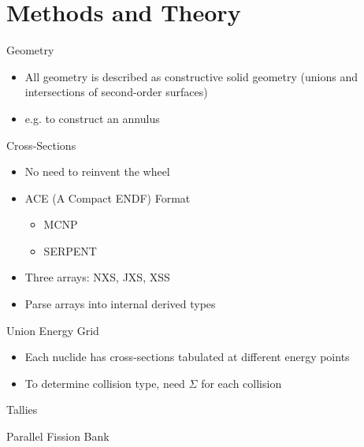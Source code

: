 \documentclass{beamer}
\begin{document}
\section{Methods and Theory}

\begin{frame}{Geometry}
  \begin{itemize}
  \item<1-> All geometry is described as constructive solid geometry (unions and
    intersections of second-order surfaces)
  \item<1-> e.g. to construct an annulus
  \end{itemize}
\end{frame}

\begin{frame}{Cross-Sections}
  \begin{itemize}
  \item<1-> No need to reinvent the wheel
  \item<1-> ACE (A Compact ENDF) Format
    \begin{itemize}
    \item<1-> MCNP
    \item<1-> SERPENT
    \end{itemize}
  \item<1-> Three arrays: NXS, JXS, XSS
  \item<1-> Parse arrays into internal derived types
  \end{itemize}
\end{frame}

\begin{frame}{Union Energy Grid}
  \begin{itemize}
  \item<1-> Each nuclide has cross-sections tabulated at different energy points
  \item<1-> To determine collision type, need $\Sigma$ for each collision
  \end{itemize}
  

\end{frame}

\begin{frame}{Tallies}
\end{frame}

\begin{frame}{Parallel Fission Bank}
\end{frame}

\end{document}
